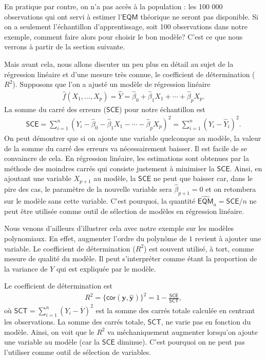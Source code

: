 \documentclass[
  11pt,
  letterpaper,
]{scrbook}
\theoremstyle{definition}
\theoremstyle{remark}
\begin{document}
En pratique par contre, on n'a pas accès à la population : les 100 000
observations qui ont servi à estimer l'\(\mathsf{EQM}\) théorique ne
seront pas disponible. Si on a seulement l'échantillon d'apprentissage,
soit 100 observations dans notre exemple, comment faire alors pour
choisir le bon modèle? C'est ce que nous verrons à partir de la section
suivante.

Mais avant cela, nous allons discuter un peu plus en détail au sujet de
la régression linéaire et d'une mesure très connue, le coefficient de
détermination (\(R^2\)). Supposons que l'on a ajusté un modèle de
régression linéaire \begin{align*}
\widehat{f}(X_1, \ldots, X_p) = \widehat{Y}=\widehat{\beta}_0 + \widehat{\beta}_1X_1+ \cdots + \widehat{\beta}_p X_p.
\end{align*} La somme du carré des erreurs (\(\mathsf{SCE}\)) pour notre
échantillon est \begin{align*}
\mathsf{SCE}=\sum_{i=1}^n (Y_i - \widehat{\beta}_0 - \widehat{\beta}_1X_1 - \cdots - \widehat{\beta}_p X_p)^2 = \sum_{i=1}^n (Y_i-\widehat{Y}_i)^2.
 \end{align*} On peut démontrer que si on ajoute une variable quelconque
au modèle, la valeur de la somme du carré des erreurs va nécessairement
baisser. Il est facile de se convaincre de cela. En régression linéaire,
les estimations sont obtenues par la méthode des moindres carrés qui
consiste justement à minimiser la \(\mathsf{SCE}\). Ainsi, en ajoutant
une variable \(X_{p+1}\) au modèle, la \(\mathsf{SCE}\) ne peut que
baisser car, dans le pire des cas, le paramètre de la nouvelle variable
sera \(\widehat{\beta}_{p+1}=0\) et on retombera sur le modèle sans
cette variable. C'est pourquoi, la quantité
\(\widehat{\mathsf{EQM}}_a=\mathsf{SCE}/n\) ne peut être utilisée comme
outil de sélection de modèles en régression linéaire.

Nous venons d'ailleurs d'illustrer cela avec notre exemple sur les
modèles polynomiaux. En effet, augmenter l'ordre du polynôme de \(1\)
revient à ajouter une variable. Le coefficient de détermination
(\(R^2\)) est souvent utilisé, à tort, comme mesure de qualité du
modèle. Il peut s'interpréter comme étant la proportion de la variance
de \(Y\) qui est expliquée par le modèle.

Le coefficient de détermination est \begin{align*}
R^2=\{\mathsf{cor}(\boldsymbol{y}, \widehat{\boldsymbol{y}})\}^2 = 1-\frac{\mathsf{SCE}}{\mathsf{SCT}},
\end{align*} où \(\mathsf{SCT}=\sum_{i=1}^n (Y_i-\overline{Y})^2\) est
la somme des carrés totale calculée en centrant les observations. La
somme des carrés totale, \(\mathsf{SCT}\), ne varie pas en fonction du
modèle. Ainsi, on voit que le \(R^2\) va méchaniquement augmenter
lorsqu'on ajoute une variable au modèle (car la \(\mathsf{SCE}\)
diminue). C'est pourquoi on ne peut pas l'utiliser comme outil de
sélection de variables.
\end{document}
